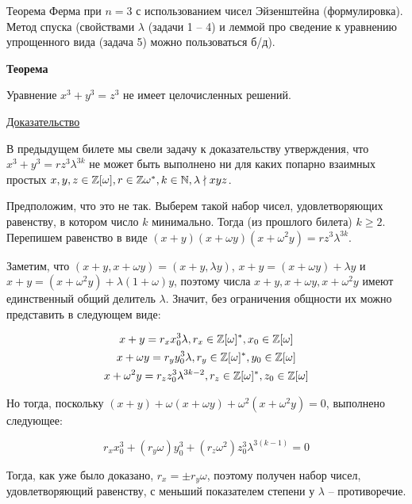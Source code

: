 Теорема Ферма при $n = 3$ с использованием чисел Эйзенштейна (формулировка).
Метод спуска (свойствами $\lambda$ (задачи 1 -- 4) и леммой 
про сведение к уравнению упрощенного вида (задача 5) можно пользоваться б/д).

\textbf{Теорема}

Уравнение $x^3 + y^3 = z^3$ не имеет целочисленных решений.

\underline{Доказательство}

В предыдущем билете мы свели задачу к доказательству утверждения, что
$x^3 + y^3 = rz^3 \lambda^{3k}$ не может быть выполнено
ни для каких попарно взаимных простых 
$x, y, z \in \mathbb{Z}[\omega], r \in \mathbb{Z}{\omega}^*, k \in \mathbb{N}, 
\lambda \nmid xyz$.

Предположим, что это не так. Выберем такой набор чисел,
удовлетворяющих равенству, в котором число $k$ минимально.
Тогда (из прошлого билета) $k \geq 2$. Перепишем равенство
в виде 
$(x + y)(x + \omega y)(x + \omega^2 y) = rz^3 \lambda^{3k}$.

Заметим, что $(x + y, x + \omega y) = (x + y, \lambda y)$,
$x + y = (x + \omega y) + \lambda y$ и
$x + y = (x + \omega^2 y) + \lambda (1 + \omega) y$,
поэтому числа $x + y, x + \omega y, x + \omega^2 y$
имеют единственный общий делитель $\lambda$.
Значит, без ограничения общности их можно представить
в следующем виде:

\begin{equation}
\begin{gathered}
x + y = r_x x_0^3 \lambda, r_x \in \mathbb{Z}[\omega]^*, 
x_0 \in \mathbb{Z}[\omega] \\
x + \omega y = r_y y_0^3 \lambda, r_y \in \mathbb{Z}[\omega]^*,
y_0 \in \mathbb{Z}[\omega] \\
x + \omega^2 y = r_z z_0^3 \lambda^{3k - 2},
r_z \in \mathbb{Z}[\omega]^*, z_0 \in \mathbb{Z}[\omega]
\end{gathered}
\end{equation}

Но тогда, поскольку 
$(x + y) + \omega (x + \omega y) + 
\omega^2 (x + \omega^2 y) = 0$,
выполнено следующее:

\[
r_x x_0^3 + (r_y \omega) y_0^3 + 
(r_z \omega^2) z_0^3 \lambda^{3(k - 1)} = 0
\]

Тогда, как уже было доказано, $r_x = \pm r_y \omega$,
поэтому получен набор чисел,
удовлетворяющий равенству, с меньший показателем степени
у $\lambda$ -- противоречие.

